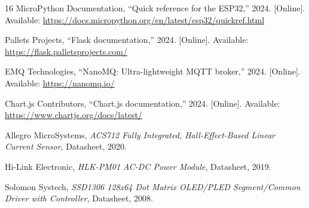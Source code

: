 \documentclass[12pt, a4paper]{article}
\numberwithin{figure}{section}
\numberwithin{table}{section}
\begin{document}
\begin{thebibliography}{16}
		MicroPython Documentation, ``Quick reference for the ESP32,'' 2024. [Online]. Available: \url{https://docs.micropython.org/en/latest/esp32/quickref.html}
		
		Pallets Projects, ``Flask documentation,'' 2024. [Online]. Available: \url{https://flask.palletsprojects.com/}
		
		EMQ Technologies, ``NanoMQ: Ultra-lightweight MQTT broker,'' 2024. [Online]. Available: \url{https://nanomq.io/}
		
		Chart.js Contributors, ``Chart.js documentation,'' 2024. [Online]. Available: \url{https://www.chartjs.org/docs/latest/}
		
		Allegro MicroSystems, \emph{ACS712 Fully Integrated, Hall-Effect-Based Linear Current Sensor}, Datasheet, 2020.
		
		Hi-Link Electronic, \emph{HLK-PM01 AC-DC Power Module}, Datasheet, 2019.
		
		Solomon Systech, \emph{SSD1306 128x64 Dot Matrix OLED/PLED Segment/Common Driver with Controller}, Datasheet, 2008.
	\end{thebibliography}
	
\end{document}
